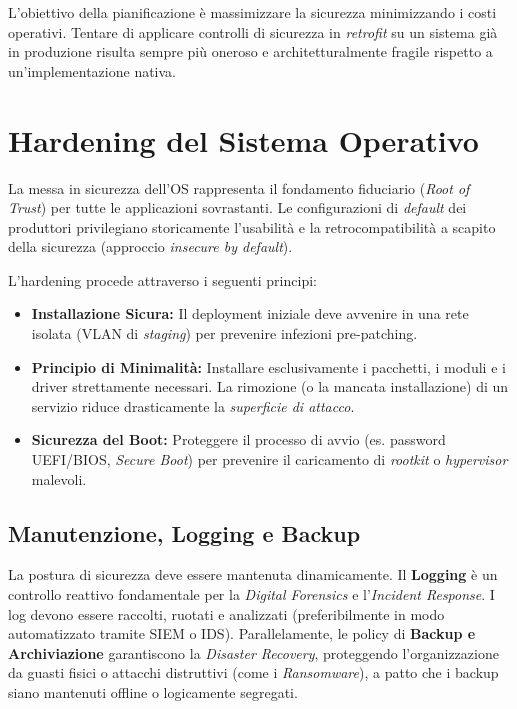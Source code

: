 L'obiettivo della pianificazione è massimizzare la sicurezza minimizzando i costi operativi. Tentare di applicare controlli di sicurezza in \textit{retrofit} su un sistema già in produzione risulta sempre più oneroso e architetturalmente fragile rispetto a un'implementazione nativa.

\section{Hardening del Sistema Operativo}
La messa in sicurezza dell'OS rappresenta il fondamento fiduciario (\textit{Root of Trust}) per tutte le applicazioni sovrastanti. Le configurazioni di \textit{default} dei produttori privilegiano storicamente l'usabilità e la retrocompatibilità a scapito della sicurezza (approccio \textit{insecure by default}). 

L'hardening procede attraverso i seguenti principi:
\begin{itemize}
    \item \textbf{Installazione Sicura:} Il deployment iniziale deve avvenire in una rete isolata (VLAN di \textit{staging}) per prevenire infezioni pre-patching.
    \item \textbf{Principio di Minimalità:} Installare esclusivamente i pacchetti, i moduli e i driver strettamente necessari. La rimozione (o la mancata installazione) di un servizio riduce drasticamente la \textit{superficie di attacco}.
    \item \textbf{Sicurezza del Boot:} Proteggere il processo di avvio (es. password UEFI/BIOS, \textit{Secure Boot}) per prevenire il caricamento di \textit{rootkit} o \textit{hypervisor} malevoli.
\end{itemize}

\subsection{Manutenzione, Logging e Backup}
La postura di sicurezza deve essere mantenuta dinamicamente. Il \textbf{Logging} è un controllo reattivo fondamentale per la \textit{Digital Forensics} e l'\textit{Incident Response}. I log devono essere raccolti, ruotati e analizzati (preferibilmente in modo automatizzato tramite SIEM o IDS). 
Parallelamente, le policy di \textbf{Backup e Archiviazione} garantiscono la \textit{Disaster Recovery}, proteggendo l'organizzazione da guasti fisici o attacchi distruttivi (come i \textit{Ransomware}), a patto che i backup siano mantenuti offline o logicamente segregati.


